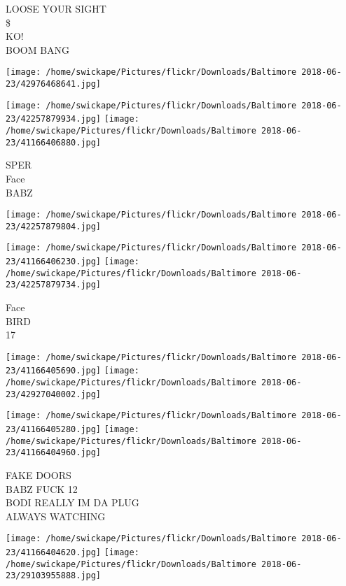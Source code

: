 \documentclass[10pt,letterpaper]{article}
\begin{document}
LOOSE YOUR SIGHT\\
\$\\
KO!\\
BOOM BANG\\
\pagebreak

\texttt{[image: /home/swickape/Pictures/flickr/Downloads/Baltimore 2018-06-23/42976468641.jpg]}

\vspace{0.25in}
\texttt{[image: /home/swickape/Pictures/flickr/Downloads/Baltimore 2018-06-23/42257879934.jpg]}
\texttt{[image: /home/swickape/Pictures/flickr/Downloads/Baltimore 2018-06-23/41166406880.jpg]}

SPER\\
Face\\
BABZ\\
\pagebreak

\texttt{[image: /home/swickape/Pictures/flickr/Downloads/Baltimore 2018-06-23/42257879804.jpg]}

\vspace{0.25in}
\texttt{[image: /home/swickape/Pictures/flickr/Downloads/Baltimore 2018-06-23/41166406230.jpg]}
\texttt{[image: /home/swickape/Pictures/flickr/Downloads/Baltimore 2018-06-23/42257879734.jpg]}

Face\\
BIRD\\
17\\
\pagebreak

\texttt{[image: /home/swickape/Pictures/flickr/Downloads/Baltimore 2018-06-23/41166405690.jpg]}
\texttt{[image: /home/swickape/Pictures/flickr/Downloads/Baltimore 2018-06-23/42927040002.jpg]}

\texttt{[image: /home/swickape/Pictures/flickr/Downloads/Baltimore 2018-06-23/41166405280.jpg]}
\texttt{[image: /home/swickape/Pictures/flickr/Downloads/Baltimore 2018-06-23/41166404960.jpg]}

FAKE DOORS\\
BABZ FUCK 12\\
BODI REALLY IM DA PLUG\\
ALWAYS WATCHING\\
\pagebreak

\texttt{[image: /home/swickape/Pictures/flickr/Downloads/Baltimore 2018-06-23/41166404620.jpg]}
\texttt{[image: /home/swickape/Pictures/flickr/Downloads/Baltimore 2018-06-23/29103955888.jpg]}
\end{document}
